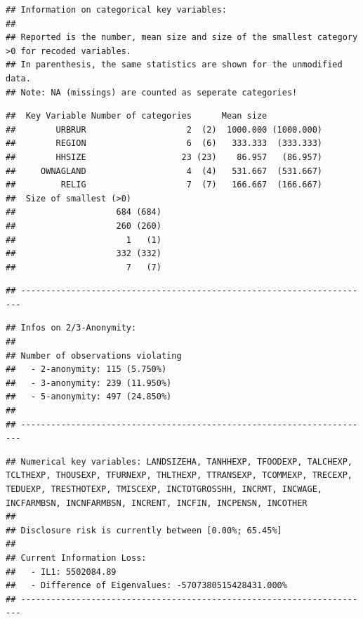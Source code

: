 \documentclass[]{book}
\theoremstyle{definition}
\theoremstyle{definition}
\theoremstyle{definition}
\theoremstyle{definition}
\theoremstyle{remark}
\begin{document}
\begin{verbatim}
## Information on categorical key variables:
## 
## Reported is the number, mean size and size of the smallest category >0 for recoded variables.
## In parenthesis, the same statistics are shown for the unmodified data.
## Note: NA (missings) are counted as seperate categories!
\end{verbatim}

\begin{verbatim}
##  Key Variable Number of categories      Mean size           
##        URBRUR                    2  (2)  1000.000 (1000.000)
##        REGION                    6  (6)   333.333  (333.333)
##        HHSIZE                   23 (23)    86.957   (86.957)
##     OWNAGLAND                    4  (4)   531.667  (531.667)
##         RELIG                    7  (7)   166.667  (166.667)
##  Size of smallest (>0)      
##                    684 (684)
##                    260 (260)
##                      1   (1)
##                    332 (332)
##                      7   (7)
\end{verbatim}

\begin{verbatim}
## ----------------------------------------------------------------------
\end{verbatim}

\begin{verbatim}
## Infos on 2/3-Anonymity:
## 
## Number of observations violating
##   - 2-anonymity: 115 (5.750%)
##   - 3-anonymity: 239 (11.950%)
##   - 5-anonymity: 497 (24.850%)
## 
## ----------------------------------------------------------------------
\end{verbatim}

\begin{verbatim}
## Numerical key variables: LANDSIZEHA, TANHHEXP, TFOODEXP, TALCHEXP, TCLTHEXP, THOUSEXP, TFURNEXP, THLTHEXP, TTRANSEXP, TCOMMEXP, TRECEXP, TEDUEXP, TRESTHOTEXP, TMISCEXP, INCTOTGROSSHH, INCRMT, INCWAGE, INCFARMBSN, INCNFARMBSN, INCRENT, INCFIN, INCPENSN, INCOTHER
## 
## Disclosure risk is currently between [0.00%; 65.45%]
## 
## Current Information Loss:
##   - IL1: 5502084.89
##   - Difference of Eigenvalues: -5707380515428431.000%
## ----------------------------------------------------------------------
\end{verbatim}
\end{document}
